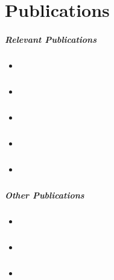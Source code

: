 \chapter{Publications} 

\paragraph{Relevant Publications}

\begin{itemize}
  \item \cite{KieferM14b} 
  \item \cite{KieferM14a} 
  \item \cite{KieferM15a} 
  \item \cite{KieferM15c} 
  \item \cite{DongK15a} 
\end{itemize}

\paragraph{Other Publications}

\begin{itemize}
  \item \cite{FGKMP2013} 
  \item \cite{BHK2013} 
  \item \cite{opake} 
\end{itemize}
